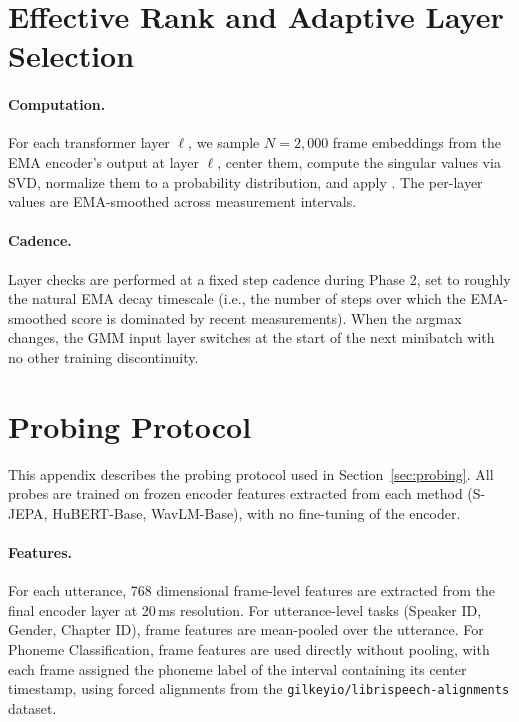 \documentclass[9pt,twocolumn]{article}
\theoremstyle{plain}
\theoremstyle{definition}
\theoremstyle{remark}
\begin{document}
\section{Effective Rank and Adaptive Layer Selection}
\label{app:erank_calibration}

\paragraph{Computation.} For each transformer layer $\ell$, we sample $N\!=\!2{,}000$ frame embeddings from the EMA encoder's output at layer $\ell$, center them, compute the singular values via SVD, normalize them to a probability distribution, and apply . The per-layer values are EMA-smoothed across measurement intervals.

\paragraph{Cadence.} Layer checks are performed at a fixed step cadence during Phase 2, set to roughly the natural EMA decay timescale (i.e., the number of steps over which the EMA-smoothed score is dominated by recent measurements). When the argmax changes, the GMM input layer switches at the start of the next minibatch with no other training discontinuity.

\section{Probing Protocol}
\label{app:probing}
 
This appendix describes the probing protocol used in Section~\ref{sec:probing}. All probes are trained on frozen encoder features extracted from each method (S-JEPA, HuBERT-Base, WavLM-Base), with no fine-tuning of the encoder.
 
\paragraph{Features.} For each utterance, 768 dimensional frame-level features are extracted from the final encoder layer at 20\,ms resolution. For utterance-level tasks (Speaker ID, Gender, Chapter ID), frame features are mean-pooled over the utterance. For Phoneme Classification, frame features are used directly without pooling, with each frame assigned the phoneme label of the interval containing its center timestamp, using forced alignments from the \texttt{gilkeyio/librispeech-alignments} dataset.
\end{document}
